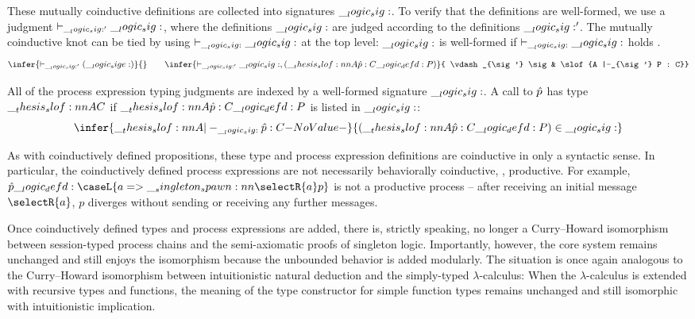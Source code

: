 These mutually coinductive definitions are collected into signatures $\__logic_sig:$.
To verify that the definitions are well-formed, we use a judgment $\vdash_{\__logic_sig:'} \__logic_sig:$, where the definitions $\__logic_sig:$ are judged according to the definitions $\__logic_sig:'$.
The mutually coinductive knot can be tied by using $\vdash_{\__logic_sig:} \__logic_sig:$ at the top level: $\__logic_sig:$ is well-formed if $\vdash_{\__logic_sig:} \__logic_sig:$ holds .
\begin{equation*}
  \infer{\vdash_{\sig'} (\sige)}{}
  \qquad
  \infer{\vdash_{\sig'} \sig, (\slof{A |- \defp{p} : C} \defd P)}{
    \vdash_{\sig'} \sig & \slof{A |-_{\sig'} P : C}}
\end{equation*}

All of the process expression typing judgments are indexed by a well-formed signature $\__logic_sig:$.
A call to $\hat{p}$ has type $\slof{A |- C}$ if $\slof{A |- \defp{p} : C} \defd P$ is listed in $\__logic_sig:$:
\begin{equation*}
  \infer{\slof{A |-_{\sig} \defp{p} : C}}{
    (\slof{A |- \defp{p} : C} \defd P) \in \sig}
\end{equation*}

As with coinductively defined propositions, these type and process expression definitions are coinductive in only a syntactic sense.
In particular, the coinductively defined process expressions are not necessarily behaviorally coinductive, \ie, productive.
For example, $\defp{p} \defd \caseL{a => \spawn{\selectR{a}}{p}}$ is not a productive process -- after receiving an initial message $\selectR{a}$, $p$ diverges without sending or receiving any further messages.

Once coinductively defined types and process expressions are added, there is, strictly speaking, no longer a Curry--Howard isomorphism between session-typed process chains and the semi-axiomatic proofs of singleton logic.
Importantly, however, the core system remains unchanged and still enjoys the isomorphism because the unbounded behavior is added modularly.
The situation is once again analogous to the Curry--Howard isomorphism between intuitionistic natural deduction and the simply-typed $\lambda$-calculus:
When the $\lambda$-calculus is extended with recursive types and functions, the meaning of the type constructor for simple function types remains unchanged and still isomorphic with intuitionistic implication.

